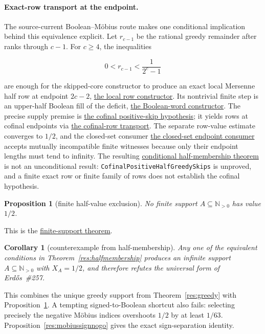 \documentclass[11pt]{article}
\newcommand{\commit}{bb4e24651b37cd096d3749ef299c3317930b3a3b}
\newcommand{\repobase}{https://github.com/wcook04/plectis-lean-erdos249-257/blob/\commit}
\newcommand{\PK}{Erdos249257}
\newcommand{\lword}[4]{\href{\repobase/\PK/#1\#L#2}{#4}}
\newtheorem{proposition}[theorem]{Proposition}
\newtheorem{corollary}[theorem]{Corollary}
\theoremstyle{definition}
\theoremstyle{remark}
\newcommand{\Npos}{\mathbb{N}_{>0}}
\begin{document}
\paragraph{Exact-row transport at the endpoint.}
The source-current Boolean--M\"obius route makes one conditional implication
behind this equivalence explicit.  Let $r_{c-1}$ be the rational greedy
remainder after ranks through $c-1$.  For $c\ge4$, the inequalities

\[
  0<r_{c-1}<\frac{1}{2^c-1}
\]

are enough for the skipped-core constructor to produce an exact local
Mersenne half row at endpoint $2c-2$,
\lword{BooleanMobiusSkipRowCofinal.lean}{55}{exactLocalMersenneHalfRow_of_positiveHalfGreedySkip}{the local row constructor}.
Its nontrivial finite step is an upper-half Boolean fill of the deficit,
\lword{BooleanMobiusSkippedCoreExactRow.lean}{228}{exists_upperHalfBooleanWord_of_skippedCore}{the Boolean-word constructor}.
The precise supply premise is
\lword{BooleanMobiusSkipRowCofinal.lean}{22}{CofinalPositiveHalfGreedySkips}{the cofinal positive-skip hypothesis};
it yields rows at cofinal endpoints via
\lword{BooleanMobiusSkipRowCofinal.lean}{84}{cofinalExactLocalMersenneHalfRows_of_positiveHalfGreedySkips}{the cofinal-row transport}.
The separate row-value estimate converges to $1/2$, and the closed-set
consumer
\lword{BooleanMobiusCofinalExactRows.lean}{71}{half_mem_mersenneAchievementSet_of_cofinalExactLocalRows}{the closed-set endpoint consumer}
accepts mutually incompatible finite witnesses because only their endpoint
lengths must tend to infinity.  The resulting
\lword{BooleanMobiusSkipRowCofinal.lean}{97}{half_mem_mersenneAchievementSet_of_positiveHalfGreedySkips}{conditional half-membership theorem}
is not an unconditional result: \texttt{CofinalPositiveHalfGreedySkips} is
unproved, and a finite exact row or finite family of rows does not establish
the cofinal hypothesis.

\begin{proposition}[finite half-value exclusion]\label{res:nofinitehalf}
No finite support \(A\subseteq\Npos\) has value \(1/2\).
\end{proposition}
\noindent This is the
\lword{HalfCarryReachability.lean}{589}{finite_boolSupport_ne_half}{finite-support theorem}.

\begin{corollary}[counterexample from half-membership]\label{res:halfcounterexample}
Any one of the equivalent conditions in
Theorem~\ref{res:halfmembership} produces an infinite support
\(A\subseteq\Npos\) with \(X_A=1/2\), and therefore refutes the
universal form of Erd\H{o}s~\#257.
\end{corollary}
\noindent This combines the unique greedy support from
Theorem~\ref{res:greedy} with Proposition~\ref{res:nofinitehalf}.
A tempting signed-to-Boolean shortcut also fails: selecting precisely the
negative M\"obius indices overshoots \(1/2\) by at least \(1/63\).
Proposition~\ref{res:mobiussignnogo} gives the exact sign-separation identity.
\end{document}
